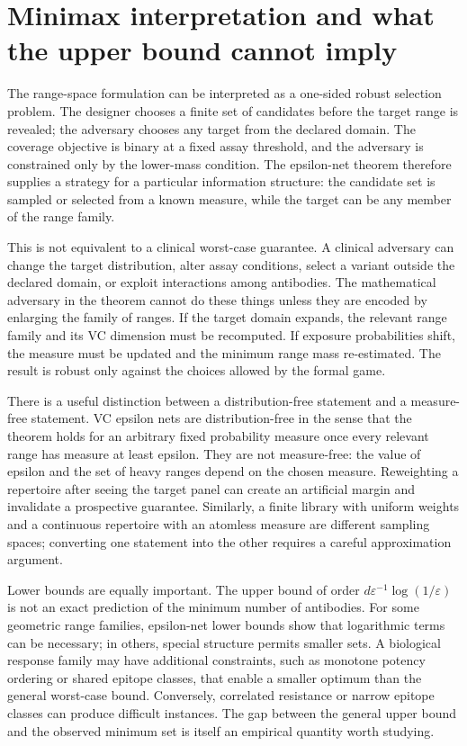 \documentclass[11pt,a4paper]{article}
\newcommand{\eps}{\varepsilon}
\begin{document}
\section{Minimax interpretation and what the upper bound cannot imply}
The range-space formulation can be interpreted as a one-sided robust selection problem. The designer chooses a finite set of candidates before the target range is revealed; the adversary chooses any target from the declared domain. The coverage objective is binary at a fixed assay threshold, and the adversary is constrained only by the lower-mass condition. The epsilon-net theorem therefore supplies a strategy for a particular information structure: the candidate set is sampled or selected from a known measure, while the target can be any member of the range family.

This is not equivalent to a clinical worst-case guarantee. A clinical adversary can change the target distribution, alter assay conditions, select a variant outside the declared domain, or exploit interactions among antibodies. The mathematical adversary in the theorem cannot do these things unless they are encoded by enlarging the family of ranges. If the target domain expands, the relevant range family and its VC dimension must be recomputed. If exposure probabilities shift, the measure must be updated and the minimum range mass re-estimated. The result is robust only against the choices allowed by the formal game.

There is a useful distinction between a distribution-free statement and a measure-free statement. VC epsilon nets are distribution-free in the sense that the theorem holds for an arbitrary fixed probability measure once every relevant range has measure at least epsilon. They are not measure-free: the value of epsilon and the set of heavy ranges depend on the chosen measure. Reweighting a repertoire after seeing the target panel can create an artificial margin and invalidate a prospective guarantee. Similarly, a finite library with uniform weights and a continuous repertoire with an atomless measure are different sampling spaces; converting one statement into the other requires a careful approximation argument.

Lower bounds are equally important. The upper bound of order $d\eps^{-1}\log(1/\eps)$ is not an exact prediction of the minimum number of antibodies. For some geometric range families, epsilon-net lower bounds show that logarithmic terms can be necessary; in others, special structure permits smaller sets. A biological response family may have additional constraints, such as monotone potency ordering or shared epitope classes, that enable a smaller optimum than the general worst-case bound. Conversely, correlated resistance or narrow epitope classes can produce difficult instances. The gap between the general upper bound and the observed minimum set is itself an empirical quantity worth studying.
\end{document}
